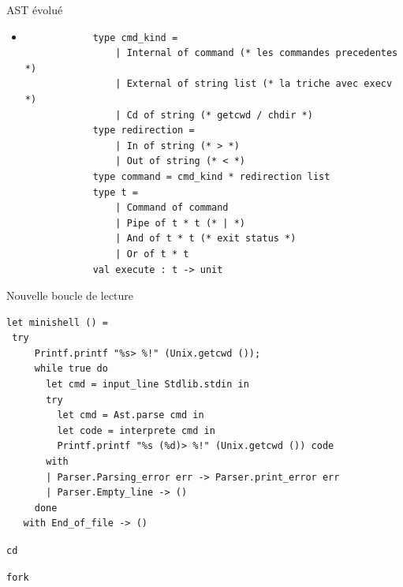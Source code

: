 \begin{frame}[fragile]{AST évolué}
    \begin{itemize}[leftmargin=-10pt] 
         \item
        \begin{lstlisting}
            type cmd_kind =
                | Internal of command (* les commandes precedentes *)
                | External of string list (* la triche avec execv *)
                | Cd of string (* getcwd / chdir *)
            type redirection =
                | In of string (* > *)
                | Out of string (* < *)
            type command = cmd_kind * redirection list
            type t = 
                | Command of command
                | Pipe of t * t (* | *)
                | And of t * t (* exit status *)
                | Or of t * t
            val execute : t -> unit
        \end{lstlisting}
    \end{itemize}

\end{frame}

\begin{frame}[fragile]{Nouvelle boucle de lecture}
\begin{lstlisting}
let minishell () =
 try
     Printf.printf "%s> %!" (Unix.getcwd ());
     while true do
       let cmd = input_line Stdlib.stdin in
       try 
         let cmd = Ast.parse cmd in
         let code = interprete cmd in
         Printf.printf "%s (%d)> %!" (Unix.getcwd ()) code
       with
       | Parser.Parsing_error err -> Parser.print_error err
       | Parser.Empty_line -> ()
     done
   with End_of_file -> ()
\end{lstlisting}
\end{frame}

\begin{frame}{}
    
\end{frame}

\begin{frame}{\texttt{cd}}
    
\end{frame}

\begin{frame}{\texttt{fork}}

\end{frame}
